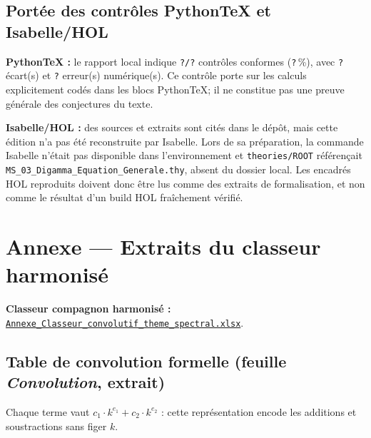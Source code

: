 \documentclass[11pt,a4paper]{article}
\newcommand{\vtotal}{?}\newcommand{\vconf}{?}\newcommand{\vtaux}{?}
\newcommand{\vecart}{?}\newcommand{\vnul}{?}\newcommand{\vnan}{?}
\begin{document}
\subsection{Portée des contrôles PythonTeX et Isabelle/HOL}
\begin{boitealerte}
\textbf{PythonTeX :} le rapport local indique
\texttt{\vconf/\vtotal} contrôles conformes (\texttt{\vtaux}\,\%),
avec \texttt{\vecart} écart(s) et \texttt{\vnan} erreur(s) numérique(s).
Ce contrôle porte sur les calculs explicitement codés dans les blocs
PythonTeX; il ne constitue pas une preuve générale des conjectures du texte.

\medskip
\textbf{Isabelle/HOL :} des sources et extraits sont cités dans le dépôt,
mais cette édition n'a pas été reconstruite par Isabelle. Lors de sa
préparation, la commande Isabelle n'était pas disponible dans l'environnement
et \texttt{theories/ROOT} référençait
\texttt{MS\_03\_Digamma\_Equation\_Generale.thy}, absent du dossier local.
Les encadrés HOL reproduits doivent donc être lus comme des extraits de
formalisation, et non comme le résultat d'un build HOL fraîchement vérifié.
\end{boitealerte}

\section{Annexe --- Extraits du classeur harmonisé}
\textbf{Classeur compagnon harmonisé :}
\href{run:assets/Annexe_Classeur_convolutif_theme_spectral.xlsx}
{\texttt{Annexe\_Classeur\_convolutif\_theme\_spectral.xlsx}}.

\subsection{Table de convolution formelle (feuille \emph{Convolution}, extrait)}

Chaque terme vaut $c_1 \cdot k^{e_1} + c_2 \cdot k^{e_2}$ : cette
représentation encode les additions et soustractions sans figer $k$.
\end{document}
